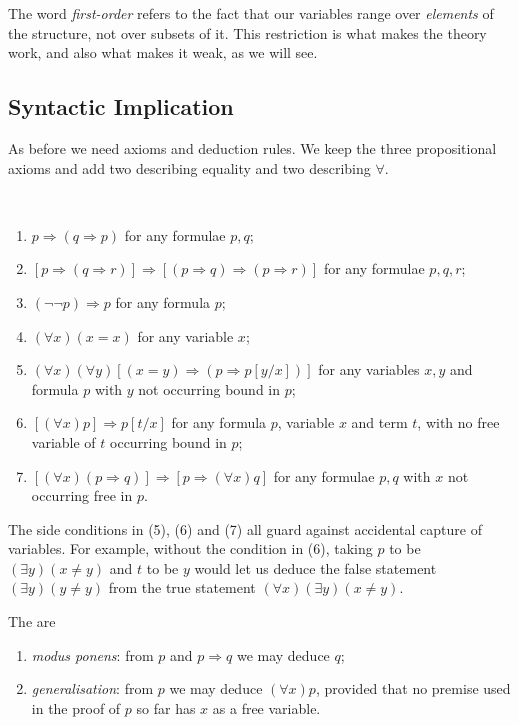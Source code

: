 \documentclass[a4paper]{scrartcl}
\begin{document}
The word \emph{first-order} refers to the fact that our variables range over \emph{elements} of the structure, not over subsets of it. This restriction is what makes the theory work, and also what makes it weak, as we will see.

\subsection{Syntactic Implication}

As before we need axioms and deduction rules. We keep the three propositional axioms and add two describing equality and two describing $\forall$.

\begin{axiom}~
  \begin{enumerate}[label=(\arabic*)]
    \item $p \Rightarrow (q \Rightarrow p)$ for any formulae $p, q$;
    \item $[p \Rightarrow (q \Rightarrow r)] \Rightarrow [(p \Rightarrow q) \Rightarrow (p \Rightarrow r)]$ for any formulae $p, q, r$;
    \item $(\lnot \lnot p) \Rightarrow p$ for any formula $p$;
    \item $(\forall x)(x = x)$ for any variable $x$;
    \item $(\forall x)(\forall y)[(x = y) \Rightarrow (p \Rightarrow p[y/x])]$ for any variables $x, y$ and formula $p$ with $y$ not occurring bound in $p$;
    \item $[(\forall x)p] \Rightarrow p[t/x]$ for any formula $p$, variable $x$ and term $t$, with no free variable of $t$ occurring bound in $p$;
    \item $[(\forall x)(p\Rightarrow q)] \Rightarrow [p\Rightarrow(\forall x)q]$ for any formulae $p, q$ with $x$ not occurring free in $p$.
  \end{enumerate}
\end{axiom}

The side conditions in (5), (6) and (7) all guard against accidental capture of variables. For example, without the condition in (6), taking $p$ to be $(\exists y)(x \neq y)$ and $t$ to be $y$ would let us deduce the false statement $(\exists y)(y \neq y)$ from the true statement $(\forall x)(\exists y)(x \neq y)$.

\begin{definition}
  The  are
  \begin{enumerate}[label=(\roman*)]
    \item \emph{modus ponens}: from $p$ and $p \Rightarrow q$ we may deduce $q$;
    \item \emph{generalisation}: from $p$ we may deduce $(\forall x)p$, provided that no premise used in the proof of $p$ so far has $x$ as a free variable.
  \end{enumerate}
\end{definition}
\end{document}
